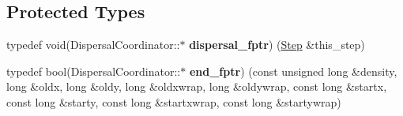 \subsection*{Protected Types}
\begin{DoxyCompactItemize}
\item 
typedef void(Dispersal\+Coordinator\+::$\ast$ {\bfseries dispersal\+\_\+fptr}) (\hyperlink{struct_step}{Step} \&this\+\_\+step)\hypertarget{class_dispersal_coordinator_a95a865c016904f23990926af1e7534da}{}\label{class_dispersal_coordinator_a95a865c016904f23990926af1e7534da}

\item 
typedef bool(Dispersal\+Coordinator\+::$\ast$ {\bfseries end\+\_\+fptr}) (const unsigned long \&density, long \&oldx, long \&oldy, long \&oldxwrap, long \&oldywrap, const long \&startx, const long \&starty, const long \&startxwrap, const long \&startywrap)\hypertarget{class_dispersal_coordinator_a6f3d41e77253cb394c63253431decd36}{}\label{class_dispersal_coordinator_a6f3d41e77253cb394c63253431decd36}

\end{DoxyCompactItemize}
